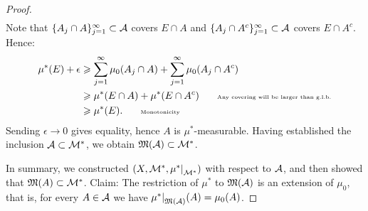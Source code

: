 \begin{proof}
\begin{equation*}
\begin{split}
                \end{split}
                \end{equation*}
            Note that $\{A_j \cap A\}_{j = 1}^\infty \subset \mathcal{A}$ covers $E \cap A$ and $\{A_j \cap A^c \}_{j = 1}^\infty \subset \mathcal{A}$ covers $E \cap A^c$. Hence:
                \begin{equation*}
                \begin{split}
                    \mu^\ast(E) + \epsilon 
                    & \geq \sum_{j = 1}^\infty \mu_0(A_j \cap A) + \sum_{j = 1}^\infty\mu_0 (A_j \cap A^c) \\
                    & \geq \mu^\ast(E \cap A) + \mu^\ast(E \cap A^c) \h9\h9\text{\tiny Any covering will be larger than g.l.b.}\\
                    & \geq \mu^\ast(E). \h9\h9\text{\tiny Monotonicity}
                \end{split}
                \end{equation*}
            Sending $\epsilon \rightarrow 0$ gives equality, hence $A$ is $\mu^\ast$-measurable. Having established the inclusion $\mathcal{A} \subset \mathcal{M}^\ast$, we obtain $\mathfrak{M}(\mathcal{A}) \subset \mathcal{M}^\ast$.

            In summary, we constructed $(X,\cM^\ast,\restr{\mu^\ast}{\cM^\ast})$ with respect to $\mathcal{A}$, and then showed that $\mathfrak{M}(A) \subset \mathcal{M}^\ast$. Claim: The restriction of $\mu^\ast$ to $\mathfrak{M}(\mathcal{A})$ is an extension of $\mu_0$, that is, for every $A \in \mathcal{A}$ we have $\restr{\mu^\ast}{\fM(\cA)}(A) = \mu_0(A)$.


\end{proof}
